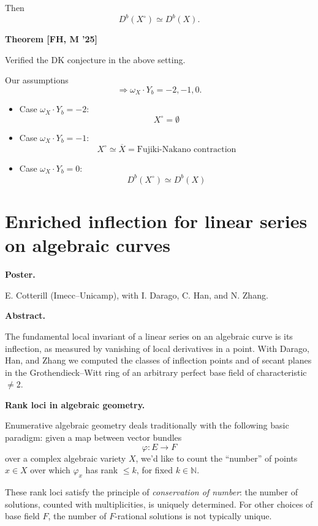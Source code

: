 Then
$$
D^b(X^\circ)\simeq D^b(X).
$$

\medskip\noindent
{\bf Theorem [FH, M '25]}

Verified the DK conjecture in the above
setting.

Our assumptions
$$
\Longrightarrow
\omega_X\cdot Y_b=-2,-1,0.
$$

\begin{itemize}
\item Case $\omega_X\cdot Y_b=-2$:
$$
X^\circ=\emptyset
$$

\item Case $\omega_X\cdot Y_b=-1$:
$$
X^\circ\simeq\overline X
=
\text{Fujiki-Nakano contraction}
$$

\item Case $\omega_X\cdot Y_b=0$:
$$
D^b(X^\circ)\simeq D^b(X)
$$
\end{itemize}



\section{Enriched inflection for linear
series on algebraic curves}
\label{section-enriched-inflection-linear-series}

\medskip\noindent
{\bf Poster.}

E. Cotterill
(Imecc--Unicamp),
with I. Darago, C. Han, and N. Zhang.

\medskip\noindent
{\bf Abstract.}

The fundamental local invariant of a
linear series on an algebraic curve is its
inflection, as measured by vanishing of
local derivatives in a point.
With Darago, Han, and Zhang we computed
the classes of inflection points and of
secant planes in the Grothendieck--Witt
ring of an arbitrary perfect base field
of characteristic $\neq 2$.

\medskip\noindent
{\bf Rank loci in algebraic geometry.}

Enumerative algebraic geometry deals
traditionally with the following basic
paradigm: given a map between vector
bundles
$$
\varphi\colon E\longrightarrow F
$$
over a complex algebraic variety $X$,
we'd like to count the ``number'' of
points $x\in X$ over which $\varphi_x$
has rank $\leq k$, for fixed
$k\in\mathbb{N}$.

These rank loci satisfy the principle of
{\it conservation of number}: the number
of solutions, counted with
multiplicities, is uniquely determined.
For other choices of base field $F$, the
number of $F$-rational solutions is not
typically unique.

